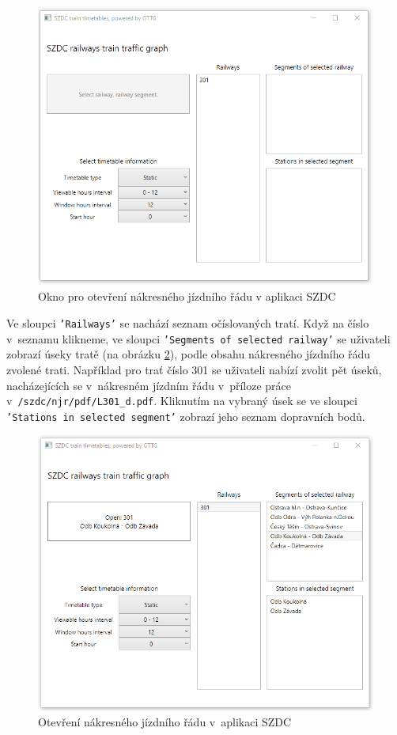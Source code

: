 \begin{figure}[!hbt]
	\centering
	\includegraphics[width=.8\textwidth]{../img/kap6_szdc_menu}
	\caption{Okno pro otevření nákresného jízdního řádu v aplikaci SZDC}
	\label{fig:kap6:szdc_menu}
\end{figure}

\newpage
Ve sloupci \texttt{'Railways'} se nachází seznam očíslovaných tratí. Když na číslo v~seznamu klikneme, ve sloupci \texttt{'Segments of selected railway'} se uživateli zobrazí úseky tratě (na obrázku \ref{fig:kap6:szdc_menu_select}), podle obsahu nákresného jízdního řádu zvolené trati. Například pro trať číslo 301 se uživateli nabízí zvolit pět úseků, nacházejících se v~nákresném jízdním řádu v~příloze práce v~\texttt{/szdc/njr/pdf/L301\_d.pdf}. Kliknutím na vybraný úsek se ve sloupci \texttt{'Stations in selected segment'} zobrazí jeho seznam dopravních bodů.

\begin{figure}[!hbt]
	\centering
	\includegraphics[width=\textwidth]{../img/kap6_szdc_menu_select}
	\caption{Otevření nákresného jízdního řádu v~aplikaci SZDC}
	\label{fig:kap6:szdc_menu_select}
\end{figure}

